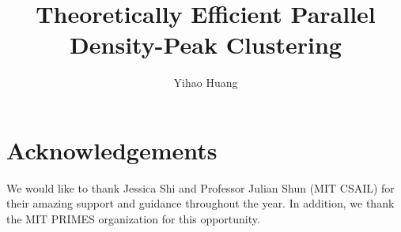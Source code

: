 \documentclass[sigconf, nonacm]{acmart} %
\title{Theoretically Efficient Parallel Density-Peak Clustering}
\author{Yihao Huang}
\affiliation{%
  \institution{Phillips Academy\\ yhuang23@andover.edu}
}
\begin{document}




\maketitle



















\section*{Acknowledgements}

We would like to thank Jessica Shi and Professor Julian Shun (MIT CSAIL) for their amazing support and guidance throughout the year. In addition, we thank the MIT PRIMES organization for this opportunity. 



\end{document}
